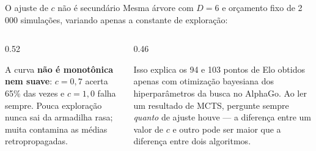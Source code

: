 \documentclass[aspectratio=169, 10pt]{beamer}
\begin{document}
\begin{frame}{O ajuste de $c$ não é secundário}
  \footnotesize
  Mesma árvore com $D=6$ e orçamento fixo de 2\,000 simulações, variando apenas a
  constante de exploração:

  \medskip
  \centering

  \medskip
  \begin{columns}[T]
    \begin{column}{0.52\textwidth}
      \begin{alertabox}
        A curva \textbf{não é monotônica nem suave}: $c=0{,}7$ acerta 65\% das
        vezes e $c=1{,}0$ falha sempre. Pouca exploração nunca sai da armadilha
        rasa; muita contamina as médias retropropagadas.
      \end{alertabox}
    \end{column}
    \begin{column}{0.46\textwidth}
      \begin{ideiabox}
        Isso explica os 94 e 103 pontos de Elo obtidos apenas com otimização
        bayesiana dos hiperparâmetros da busca no AlphaGo. Ao ler um resultado de
        MCTS, pergunte sempre \emph{quanto} de ajuste houve --- a diferença entre
        um valor de $c$ e outro pode ser maior que a diferença entre dois
        algoritmos.
      \end{ideiabox}
    \end{column}
  \end{columns}
\end{frame}
\end{document}
